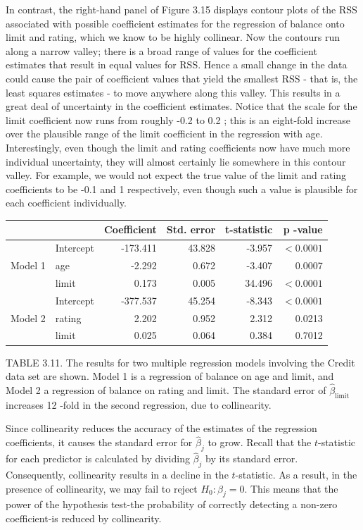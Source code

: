 \documentclass[10pt]{article}
\begin{document}
In contrast, the right-hand panel of Figure 3.15 displays contour plots of the RSS associated with possible coefficient estimates for the regression of balance onto limit and rating, which we know to be highly collinear. Now the contours run along a narrow valley; there is a broad range of values for the coefficient estimates that result in equal values for RSS. Hence a small change in the data could cause the pair of coefficient values that yield the smallest RSS - that is, the least squares estimates - to move anywhere along this valley. This results in a great deal of uncertainty in the coefficient estimates. Notice that the scale for the limit coefficient now runs from roughly -0.2 to 0.2 ; this is an eight-fold increase over the plausible range of the limit coefficient in the regression with age. Interestingly, even though the limit and rating coefficients now have much more individual uncertainty, they will almost certainly lie somewhere in this contour valley. For example, we would not expect the true value of the limit and rating coefficients to be -0.1 and 1 respectively, even though such a value is plausible for each coefficient individually.

\begin{center}
\begin{tabular}{ll|rrrr}
\hline
 &  & Coefficient & Std. error & t-statistic & p -value \\
\hline
\multirow{3}{*}{Model 1} & Intercept & -173.411 & 43.828 & -3.957 & $<0.0001$ \\
 & age & -2.292 & 0.672 & -3.407 & 0.0007 \\
 & limit & 0.173 & 0.005 & 34.496 & $<0.0001$ \\
\hline
 & Intercept & -377.537 & 45.254 & -8.343 & $<0.0001$ \\
Model 2 & rating & 2.202 & 0.952 & 2.312 & 0.0213 \\
 & limit & 0.025 & 0.064 & 0.384 & 0.7012 \\
\hline
\end{tabular}
\end{center}

TABLE 3.11. The results for two multiple regression models involving the Credit data set are shown. Model 1 is a regression of balance on age and limit, and Model 2 a regression of balance on rating and limit. The standard error of $\hat{\beta}_{\text {limit }}$ increases 12 -fold in the second regression, due to collinearity.

Since collinearity reduces the accuracy of the estimates of the regression coefficients, it causes the standard error for $\hat{\beta}_{j}$ to grow. Recall that the $t$-statistic for each predictor is calculated by dividing $\hat{\beta}_{j}$ by its standard error. Consequently, collinearity results in a decline in the $t$-statistic. As a result, in the presence of collinearity, we may fail to reject $H_{0}: \beta_{j}=0$. This means that the power of the hypothesis test-the probability of correctly detecting a non-zero coefficient-is reduced by collinearity.
\end{document}
